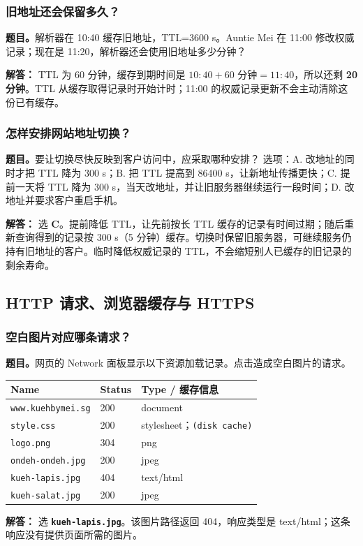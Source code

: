 \documentclass[11pt,a4paper,fontset=fandol]{ctexart}
\renewcommand{\exercisequestion}[2]{%
  \Needspace{5\baselineskip}%
  \subsubsection{#2}\label{exercise:#1}%
}
\renewenvironment{checkedsolution}
  {\par\nopagebreak[4]\textbf{解答：}\ignorespaces}
  {\par}
\begin{document}
\exercisequestion{SC2008-HW06-Q08}{旧地址还会保留多久？}
\textbf{题目。}解析器在 10:40 缓存旧地址，TTL=3600 s。Auntie Mei 在 11:00 修改权威记录；现在是 11:20，解析器还会使用旧地址多少分钟？
\begin{checkedsolution}
TTL 为 60 分钟，缓存到期时间是 $10{:}40+60\text{ 分钟}=11{:}40$，所以还剩 \textbf{20 分钟}。TTL 从缓存取得记录时开始计时；11:00 的权威记录更新不会主动清除这份已有缓存。
\end{checkedsolution}

\exercisequestion{SC2008-HW06-Q09}{怎样安排网站地址切换？}
\textbf{题目。}要让切换尽快反映到客户访问中，应采取哪种安排？
选项：A. 改地址的同时才把 TTL 降为 300 s；B. 把 TTL 提高到 86400 s，让新地址传播更快；C. 提前一天将 TTL 降为 300 s，当天改地址，并让旧服务器继续运行一段时间；D. 改地址并要求客户重启手机。
\begin{checkedsolution}
选 \textbf{C}。提前降低 TTL，让先前按长 TTL 缓存的记录有时间过期；随后重新查询得到的记录按 300 s（5 分钟）缓存。切换时保留旧服务器，可继续服务仍持有旧地址的客户。临时降低权威记录的 TTL，不会缩短别人已缓存的旧记录的剩余寿命。
\end{checkedsolution}

\subsection{HTTP 请求、浏览器缓存与 HTTPS}

\exercisequestion{SC2008-HW06-Q10}{空白图片对应哪条请求？}
\textbf{题目。}网页的 Network 面板显示以下资源加载记录。点击造成空白图片的请求。
\begin{center}
\small
\begin{tabular}{@{}lll@{}}
\toprule
Name & Status & Type / 缓存信息 \\
\midrule
\texttt{www.kuehbymei.sg} & 200 & document \\
\texttt{style.css} & 200 & stylesheet；\texttt{(disk cache)} \\
\texttt{logo.png} & 304 & png \\
\texttt{ondeh-ondeh.jpg} & 200 & jpeg \\
\texttt{kueh-lapis.jpg} & 404 & text/html \\
\texttt{kueh-salat.jpg} & 200 & jpeg \\
\bottomrule
\end{tabular}
\end{center}
\begin{checkedsolution}
选 \textbf{\texttt{kueh-lapis.jpg}}。该图片路径返回 404，响应类型是 text/html；这条响应没有提供页面所需的图片。
\end{checkedsolution}
\end{document}
